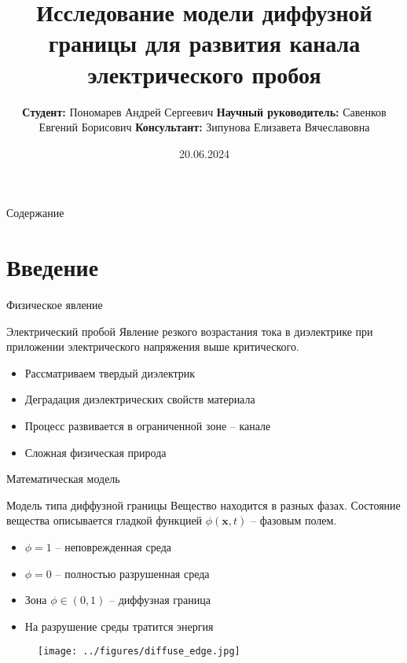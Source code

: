 \documentclass[aspectratio=169]{beamer}
\title[Электрический пробой]{Исследование модели диффузной границы для развития канала
	электрического пробоя}
\author{
	\raggedright
	\hfill \break
	\hspace*{8cm}
	\textbf{Студент:} \linebreak
	\hspace*{8cm}
	\vspace{0.3cm}
	Пономарев Андрей Сергеевич \linebreak
	\hspace*{8cm}
	\textbf{Научный руководитель:} \linebreak
	\hspace*{8cm}
	\vspace{0.3cm}
	Савенков Евгений Борисович
	\hspace*{8cm}
	\textbf{Консультант:} \linebreak
	\hspace*{8cm}
	Зипунова Елизавета Вячеславовна
}
\date[]{20.06.2024}
\begin{document}


\begin{frame}
\titlepage
\end{frame}


\begin{frame}{Содержание}
\Large
\tableofcontents
\end{frame}


\section{Введение}

\begin{frame}{Физическое явление}
\begin{block}{Электрический пробой}
	Явление резкого возрастания тока в диэлектрике при приложении электрического напряжения
	выше критического.
\end{block}
\begin{itemize}
	\item Рассматриваем твердый диэлектрик
	\item Деградация диэлектрических свойств материала
	\item Процесс развивается в ограниченной зоне -- канале
	\item Сложная физическая природа
\end{itemize}
\end{frame}


\begin{frame}{Математическая модель}
\begin{block}{Модель типа диффузной границы}
	Вещество находится в разных фазах. Состояние вещества описывается гладкой функцией
	$\phi(\textbf{x}, t)$ -- фазовым полем.
\end{block}
\begin{itemize}
	\item $\phi = 1$ -- неповрежденная среда
	\item $\phi = 0$ -- полностью разрушенная среда
	\item Зона $\phi \in (0, 1)$ -- диффузная граница
	\item На разрушение среды тратится энергия
\end{itemize}
\begin{figure}
	\texttt{[image: ../figures/diffuse\_edge.jpg]}
\end{figure}
\end{frame}
\end{document}
